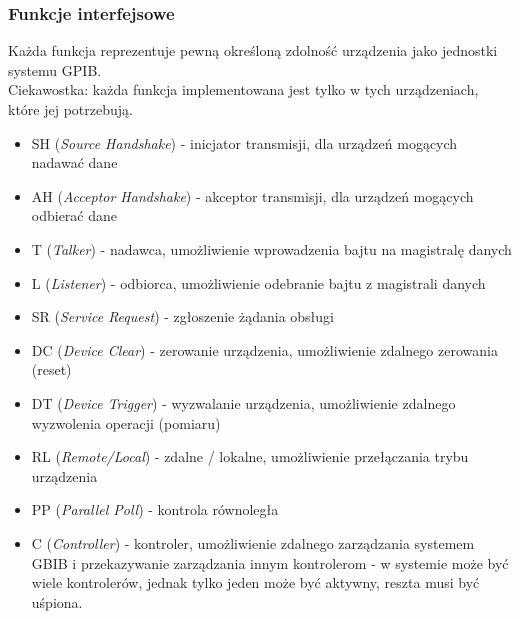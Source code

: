 \subsubsection{Funkcje interfejsowe}
Każda funkcja reprezentuje pewną określoną zdolność urządzenia jako jednostki systemu GPIB.\\
Ciekawostka: każda funkcja implementowana jest tylko w tych urządzeniach, które jej potrzebują.
\begin{itemize}
	\item SH (\emph{Source Handshake}) - inicjator transmisji, dla urządzeń mogących nadawać dane
	\item AH (\emph{Acceptor Handshake}) - akceptor transmisji, dla urządzeń mogących odbierać dane
	\item T (\emph{Talker}) - nadawca, umożliwienie wprowadzenia bajtu na magistralę danych
	\item L (\emph{Listener}) - odbiorca, umożliwienie odebranie bajtu z magistrali danych
	\item SR (\emph{Service Request}) - zgłoszenie żądania obsługi
	\item DC (\emph{Device Clear}) - zerowanie urządzenia, umożliwienie zdalnego zerowania (reset)
	\item DT (\emph{Device Trigger}) - wyzwalanie urządzenia, umożliwienie zdalnego wyzwolenia operacji (pomiaru)
	\item RL (\emph{Remote/Local}) - zdalne / lokalne, umożliwienie przełączania trybu urządzenia
	\item PP (\emph{Parallel Poll}) - kontrola równoległa
	\item C (\emph{Controller}) - kontroler, umożliwienie zdalnego zarządzania systemem GBIB i przekazywanie zarządzania innym kontrolerom - w systemie może być wiele kontrolerów, jednak tylko jeden może być aktywny, reszta musi być uśpiona.
\end{itemize}

